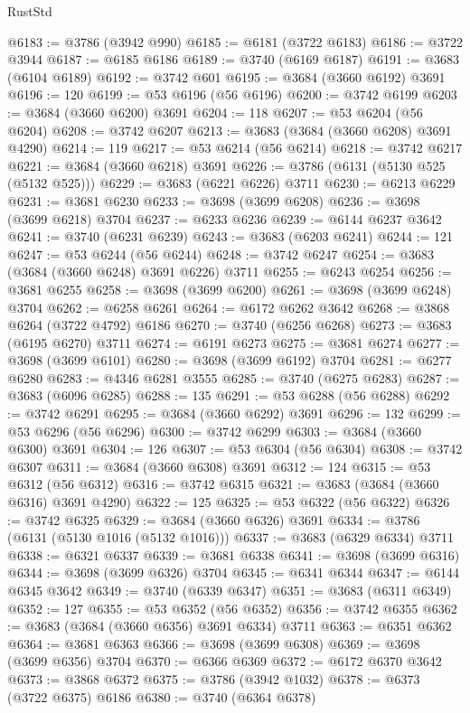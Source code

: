\begin{lexlean}{RustStd}
\begin{coremodule}
@6183 := @3786 (@3942 @990)
@6185 := @6181 (@3722 @6183)
@6186 := @3722 @3944
@6187 := @6185 @6186
@6189 := @3740 (@6169 @6187)
@6191 := @3683 (@6104 @6189)
@6192 := @3742 @601
@6195 := @3684 (@3660 @6192) @3691
@6196 := 120
@6199 := @53 @6196 (@56 @6196)
@6200 := @3742 @6199
@6203 := @3684 (@3660 @6200) @3691
@6204 := 118
@6207 := @53 @6204 (@56 @6204)
@6208 := @3742 @6207
@6213 := @3683 (@3684 (@3660 @6208) @3691 @4290)
@6214 := 119
@6217 := @53 @6214 (@56 @6214)
@6218 := @3742 @6217
@6221 := @3684 (@3660 @6218) @3691
@6226 := @3786 (@6131 (@5130 @525 (@5132 @525)))
@6229 := @3683 (@6221 @6226) @3711
@6230 := @6213 @6229
@6231 := @3681 @6230
@6233 := @3698 (@3699 @6208)
@6236 := @3698 (@3699 @6218) @3704
@6237 := @6233 @6236
@6239 := @6144 @6237 @3642
@6241 := @3740 (@6231 @6239)
@6243 := @3683 (@6203 @6241)
@6244 := 121
@6247 := @53 @6244 (@56 @6244)
@6248 := @3742 @6247
@6254 := @3683 (@3684 (@3660 @6248) @3691 @6226) @3711
@6255 := @6243 @6254
@6256 := @3681 @6255
@6258 := @3698 (@3699 @6200)
@6261 := @3698 (@3699 @6248) @3704
@6262 := @6258 @6261
@6264 := @6172 @6262 @3642
@6268 := @3868 @6264 (@3722 @4792) @6186
@6270 := @3740 (@6256 @6268)
@6273 := @3683 (@6195 @6270) @3711
@6274 := @6191 @6273
@6275 := @3681 @6274
@6277 := @3698 (@3699 @6101)
@6280 := @3698 (@3699 @6192) @3704
@6281 := @6277 @6280
@6283 := @4346 @6281 @3555
@6285 := @3740 (@6275 @6283)
@6287 := @3683 (@6096 @6285)
@6288 := 135
@6291 := @53 @6288 (@56 @6288)
@6292 := @3742 @6291
@6295 := @3684 (@3660 @6292) @3691
@6296 := 132
@6299 := @53 @6296 (@56 @6296)
@6300 := @3742 @6299
@6303 := @3684 (@3660 @6300) @3691
@6304 := 126
@6307 := @53 @6304 (@56 @6304)
@6308 := @3742 @6307
@6311 := @3684 (@3660 @6308) @3691
@6312 := 124
@6315 := @53 @6312 (@56 @6312)
@6316 := @3742 @6315
@6321 := @3683 (@3684 (@3660 @6316) @3691 @4290)
@6322 := 125
@6325 := @53 @6322 (@56 @6322)
@6326 := @3742 @6325
@6329 := @3684 (@3660 @6326) @3691
@6334 := @3786 (@6131 (@5130 @1016 (@5132 @1016)))
@6337 := @3683 (@6329 @6334) @3711
@6338 := @6321 @6337
@6339 := @3681 @6338
@6341 := @3698 (@3699 @6316)
@6344 := @3698 (@3699 @6326) @3704
@6345 := @6341 @6344
@6347 := @6144 @6345 @3642
@6349 := @3740 (@6339 @6347)
@6351 := @3683 (@6311 @6349)
@6352 := 127
@6355 := @53 @6352 (@56 @6352)
@6356 := @3742 @6355
@6362 := @3683 (@3684 (@3660 @6356) @3691 @6334) @3711
@6363 := @6351 @6362
@6364 := @3681 @6363
@6366 := @3698 (@3699 @6308)
@6369 := @3698 (@3699 @6356) @3704
@6370 := @6366 @6369
@6372 := @6172 @6370 @3642
@6373 := @3868 @6372
@6375 := @3786 (@3942 @1032)
@6378 := @6373 (@3722 @6375) @6186
@6380 := @3740 (@6364 @6378)

\end{coremodule}
\end{lexlean}

